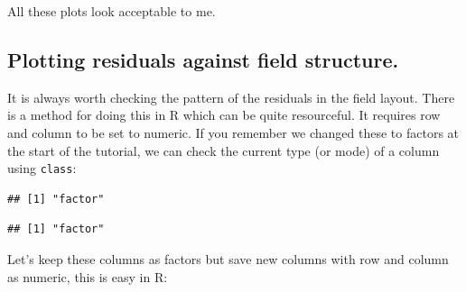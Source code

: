 \documentclass[
]{book}
\newenvironment{Shaded}{\begin{snugshade}}{\end{snugshade}}
\newcommand{\FunctionTok}[1]{\textcolor[rgb]{0.00,0.00,0.00}{#1}}
\newcommand{\NormalTok}[1]{#1}
\newcommand{\OtherTok}[1]{\textcolor[rgb]{0.56,0.35,0.01}{#1}}
\newcommand{\SpecialCharTok}[1]{\textcolor[rgb]{0.00,0.00,0.00}{#1}}
\begin{document}
All these plots look acceptable to me.

\hypertarget{plotting-residuals-against-field-structure.}{%
\subsection{Plotting residuals against field structure.}\label{plotting-residuals-against-field-structure.}}

It is always worth checking the pattern of the residuals in the field layout. There is a method for doing this in R which can be quite resourceful. It requires row and column to be set to numeric. If you remember we changed these to factors at the start of the tutorial, we can check the current type (or mode) of a column using \texttt{class}:

\begin{Shaded}
\end{Shaded}

\begin{verbatim}
## [1] "factor"
\end{verbatim}

\begin{Shaded}
\end{Shaded}

\begin{verbatim}
## [1] "factor"
\end{verbatim}

Let's keep these columns as factors but save new columns with row and column as numeric, this is easy in R:

\begin{Shaded}
\end{Shaded}
\end{document}
